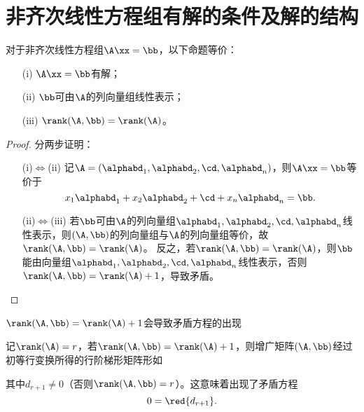 \section{非齐次线性方程组有解的条件及解的结构}

\begin{dingli}
  对于非齐次线性方程组$\A\xx=\bb$，以下命题等价：
  \begin{itemize}
  \item[(i)] $\A\xx=\bb$有解；
  \item[(ii)] $\bb$可由$\A$的列向量组线性表示；
  \item[(iii)] $\rank(\A,\bb)=\rank(\A)$。
  \end{itemize}
\end{dingli}
\begin{proof}
  分两步证明：
  \begin{itemize}
  \item[(i)$\Leftrightarrow$(ii)] 记$\A=(\alphabd_1,\alphabd_2,\cd,\alphabd_n)$，则$\A\xx=\bb$等价于
    $$
    x_1\alphabd_1+x_2\alphabd_2+\cd+x_n\alphabd_n=\bb.
    $$
  \item[(ii)$\Leftrightarrow$(iii)] 若$\bb$可由$\A$的列向量组$\alphabd_1,\alphabd_2,\cd,\alphabd_n$线性表示，则$(\A,\bb)$的列向量组与$\A$的列向量组等价，故$\rank(\A,\bb)=\rank(\A)$。    
    反之，若$\rank(\A,\bb)=\rank(\A)$，则$\bb$能由向量组$\alphabd_1,\alphabd_2,\cd,\alphabd_n$线性表示，否则$\rank(\A,\bb)=\rank(\A)+1$，导致矛盾。
  \end{itemize}
\end{proof}

\begin{zhu}
  $\rank(\A,\bb)=\rank(\A)+1$会导致矛盾方程的出现
\end{zhu}

记$\rank(\A)=r$，若$\rank(\A,\bb)=\rank(\A)+1$，则增广矩阵$(\A,\bb)$经过初等行变换所得的行阶梯形矩阵形如
\begin{center}
\end{center}
其中$d_{r+1}\ne 0$（否则$\rank(\A,\bb)=r$）。这意味着出现了矛盾方程
$$
0 = \red{d_{r+1}}.
$$    

